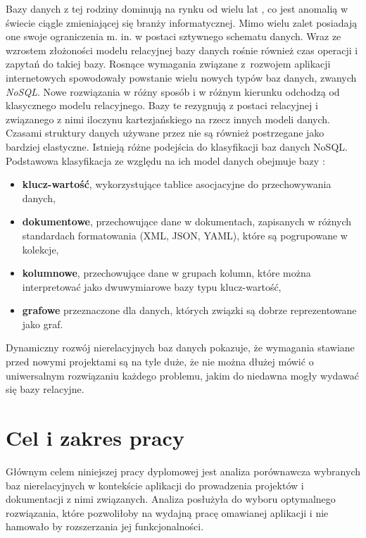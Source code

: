 Bazy danych z tej rodziny dominują na rynku od wielu lat \cite{DBEnginesRangking}, co jest anomalią w świecie ciągle zmieniającej się branży informatycznej.
Mimo wielu zalet posiadają one swoje ograniczenia m. in. w postaci sztywnego schematu danych.
Wraz ze wzrostem złożoności modelu relacyjnej bazy danych rośnie również czas operacji i zapytań do takiej bazy.
Rosnące wymagania związane z~rozwojem aplikacji internetowych spowodowały powstanie wielu nowych typów baz danych, zwanych \textit{NoSQL}.
Nowe rozwiązania w różny sposób i w różnym kierunku odchodzą od klasycznego modelu relacyjnego.
Bazy te rezygnują z postaci relacyjnej i związanego z nimi iloczynu kartezjańskiego na rzecz innych modeli danych.
Czasami struktury danych używane przez nie są również postrzegane jako bardziej elastyczne.
Istnieją różne podejścia do klasyfikacji baz danych NoSQL.
Podstawowa klasyfikacja ze względu na ich model danych obejmuje bazy \cite{NoSQLKompendiumWiedzy}:
\begin{itemize}
    \item \textbf{klucz-wartość}, wykorzystujące tablice asocjacyjne do przechowywania danych,
    \item \textbf{dokumentowe}, przechowujące dane w dokumentach, zapisanych w różnych standardach formatowania (XML, JSON, YAML), które są pogrupowane w kolekcje,
    \item \textbf{kolumnowe}, przechowujące dane w grupach kolumn, które można interpretować jako dwuwymiarowe bazy typu klucz-wartość,
    \item \textbf{grafowe} przeznaczone dla danych, których związki są dobrze reprezentowane jako graf.
\end{itemize}

Dynamiczny rozwój nierelacyjnych baz danych pokazuje, że wymagania stawiane przed nowymi projektami są na tyle duże, że nie można dłużej mówić o uniwersalnym rozwiązaniu każdego problemu, jakim do niedawna mogły wydawać się bazy relacyjne.

\section*{Cel i zakres pracy}

Głównym celem niniejszej pracy dyplomowej jest analiza porównawcza wybranych baz nierelacyjnych w kontekście aplikacji do prowadzenia projektów i dokumentacji z nimi związanych. 
Analiza posłużyła do wyboru optymalnego rozwiązania, które pozwoliłoby na wydajną pracę omawianej aplikacji i nie hamowało by rozszerzania jej funkcjonalności.

